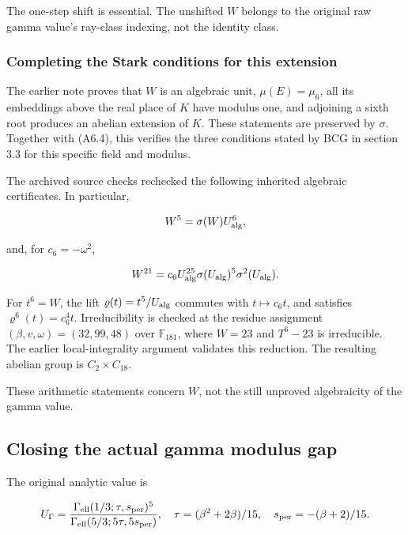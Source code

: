 The one-step shift is essential. The unshifted \(W\) belongs to the
original raw gamma value's ray-class indexing, not the identity class.

\hypertarget{A-completing-the-stark-conditions-for-this-extension}{%
\subsubsection{Completing the Stark conditions for this
extension}\label{A-completing-the-stark-conditions-for-this-extension}}

The earlier note proves that \(W\) is an algebraic unit,
\(\mu(E)=\mu_6\), all its embeddings above the real place of \(K\) have
modulus one, and adjoining a sixth root produces an abelian extension of
\(K\). These statements are preserved by \(\sigma\). Together with
(A6.4), this verifies the three conditions stated by BCG in section 3.3
for this specific field and modulus.

The archived source checks rechecked the following inherited algebraic certificates. In
particular,

\[
W^5=\sigma(W)U_{\rm alg}^6,
\]

and, for \(c_6=-\omega^2\),

\[
W^{21}=c_6U_{\rm alg}^{25}\sigma(U_{\rm alg})^5\sigma^2(U_{\rm alg}).
\]

For \(t^6=W\), the lift \(\varrho(t)=t^5/U_{\rm alg}\) commutes with
\(t\mapsto c_6t\), and satisfies \(\varrho^6(t)=c_6^4t\). Irreducibility
is checked at the residue assignment \((\beta,v,\omega)=(32,99,48)\)
over \(\mathbb F_{181}\), where \(W=23\) and \(T^6-23\) is irreducible.
The earlier local-integrality argument validates this reduction. The
resulting abelian group is \(C_2\times C_{18}\).

These arithmetic statements concern \(W\), not the still unproved
algebraicity of the gamma value.

\hypertarget{A-closing-the-actual-gamma-modulus-gap}{%
\subsection{Closing the actual gamma modulus
gap}\label{A-closing-the-actual-gamma-modulus-gap}}

The original analytic value is

\[
U_\Gamma=\frac{\Gamma_{\rm ell}(1/3;\tau,s_{\rm per})^5}
{\Gamma_{\rm ell}(5/3;5\tau,5s_{\rm per})},
\quad
\tau=(\beta^2+2\beta)/15,\quad s_{\rm per}=-(\beta+2)/15.
\]

